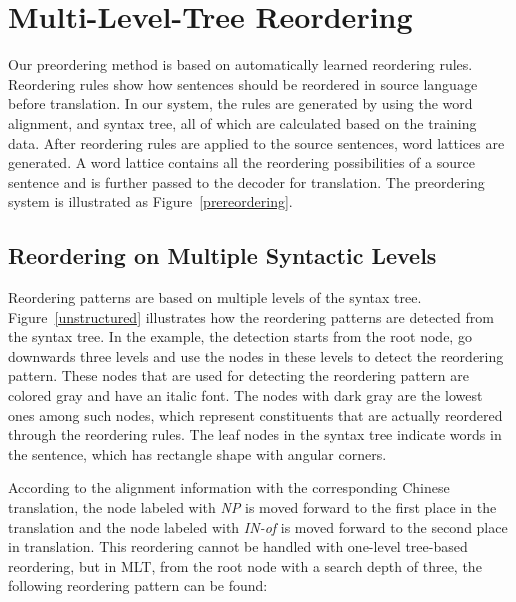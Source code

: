 \documentclass[a4paper]{article}
\begin{document}
\section{Multi-Level-Tree Reordering}
\label{mu}

Our preordering method is based on automatically learned reordering rules. Reordering rules show how sentences should be reordered in source language before translation. In our system, the rules are generated by using the word alignment, and syntax tree, all of which are calculated based on the training data. After reordering rules are applied to the source sentences, word lattices are generated. A word lattice contains all the reordering possibilities of a source sentence and is further passed to the decoder for translation. The preordering system is illustrated as Figure~\ref{prereordering}.

\begin{figure*}
\centering
{}%

\caption{Illustration of preordering system}
\label{prereordering}
\end{figure*}

\subsection{Reordering on Multiple Syntactic Levels}

Reordering patterns are based on multiple levels of the syntax tree. Figure~\ref{unstructured} illustrates how the reordering patterns are detected from the syntax tree. In the example, the detection starts from the root node, go downwards three levels and use the nodes in these levels to detect the reordering pattern. These nodes that are used for detecting the reordering pattern are colored gray and have an italic font. The nodes with dark gray are the lowest ones among such nodes, which represent constituents that are actually reordered through the reordering rules. The leaf nodes in the syntax tree indicate words in the sentence, which has rectangle shape with angular corners.

According to the alignment information with the corresponding Chinese translation, the node labeled with \emph{NP} is moved forward to the first place in the translation and the node labeled with \emph{IN-of} is moved forward to the second place in translation. This reordering cannot be handled with one-level tree-based reordering, but in MLT, from the root node with a search depth of three, the following reordering pattern can be found:\bigskip
\end{document}
